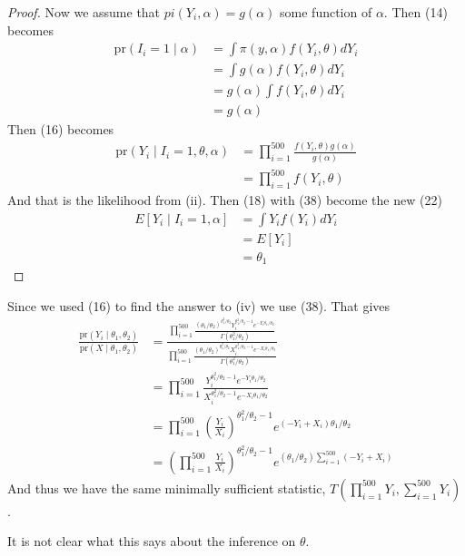 \documentclass[letterpaper, 12pt]{article}
\newcommand{\pr}{\text{pr}}
\newcommand{\sbs}{\;|\;} %
\begin{document}
\begin{enumerate}[(i)]
\begin{proof}
Now we assume that $pi(Y_i, \alpha) = g(\alpha)$ some function of $\alpha$. Then (14) becomes 
\begin{align}
\pr(I_i = 1 \sbs \alpha) 
&= \int \pi (y, \alpha) f (Y_i, \theta) dY_i \\
&= \int g(\alpha)  f (Y_i, \theta) dY_i  \\
&= g(\alpha)  \int f (Y_i, \theta) dY_i  \\
&= g(\alpha)
\end{align}
Then (16) becomes
\begin{align}
\pr(Y_i \sbs I_i = 1, \theta, \alpha) 
&= \prod_{i=1}^{500} 
\frac{f(Y_i, \theta) g(\alpha)}{g(\alpha)} \\
&= \prod_{i=1}^{500} 
f(Y_i, \theta)
\end{align}
And that is the likelihood from (ii).
Then (18) with (38) become the new (22)
\begin{align}
E[Y_i \sbs I_i = 1, \alpha] 
&= \int Y_i f(Y_i) dY_i \\
&= E[Y_i] \\
&= \theta_1
\end{align}
\end{proof}
Since we used (16) to find the answer to (iv) we use (38). 
That gives
\begin{align}
\frac{\pr(Y_i \sbs \theta_1, \theta_2)}{\pr(X \sbs \theta_1, \theta_2)} 
&= \frac{\prod_{i=1}^{500} 
\frac{(\theta_1 / \theta_2)^{\theta_1^2 / \theta_2} Y_i^{\theta_1^2 / \theta_2 -1}e^{-Y_i \theta_1/\theta_2}}
{\Gamma(\theta_1^2 / \theta_2)}}
{\prod_{i=1}^{500} 
\frac{(\theta_1 / \theta_2)^{\theta_1^2 / \theta_2} X_i^{\theta_1^2 / \theta_2 -1}e^{-X_i \theta_1/\theta_2}}
{\Gamma(\theta_1^2 / \theta_2)}} \\
&= \prod_{i=1}^{500} 
\frac{Y_i^{\theta_1^2 / \theta_2 -1 }e^{-Y_i \theta_1/\theta_2}}
{X_i^{\theta_1^2 / \theta_2 -1}e^{-X_i \theta_1/\theta_2}} \\
&= \prod_{i=1}^{500} \left(\frac{Y_i}{X_i}\right)^{\theta_1^2 /\theta_2 -1} e^{(-Y_i + X_i)\theta_1 /\theta_2} \\
&= \left( \prod_{i=1}^{500} \frac{Y_i}{X_i}\right)^{\theta_1^2 /\theta_2 -1} e^{(\theta_1 /\theta_2)\sum_{i=1}^{500}(-Y_i + X_i)}
\end{align}
And thus we have the same minimally sufficient statistic, $T(\prod_{i=1}^{500} Y_i, \sum_{i=1}^{500}Y_i)$.

It is not clear what this says about the inference on $\theta$.
\end{enumerate}
\end{document}
